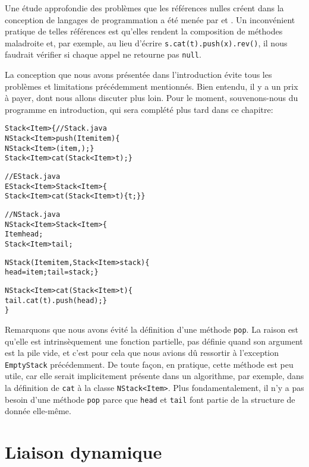 Une étude approfondie des problèmes que les références nulles créent
dans la conception de langages de programmation a été menée par
\cite{ChalinJames_2007,Cobbe_2008} et \cite{Hoare_2009}. Un
inconvénient pratique de telles références est qu'elles rendent la
composition de méthodes maladroite et, par exemple, au lieu d'écrire
\texttt{s.cat(t).push(x).rev()}, il nous faudrait vérifier si chaque
appel ne retourne pas \texttt{null}.

La conception que nous avons présentée dans l'introduction évite tous
les problèmes et limitations précédemment mentionnés. Bien entendu, il
y a un prix à payer, dont nous allons discuter plus loin. Pour le
moment, souvenons-nous du programme \Java en introduction, qui sera
complété plus tard dans ce chapitre:
\begin{alltt}
\public \abstractX \class Stack<Item> \{\hfill// Stack.java
  \public \final NStack<Item> push(\final Item item) \{
    \return \new NStack<Item>(item,\this); \}
  \public \abstractX Stack<Item> cat(\final Stack<Item> t); \}

// EStack.java
\public \final \class EStack<Item> \extends Stack<Item> \{
  \public Stack<Item> cat(\final Stack<Item> t) \{ \return t; \}\}

// NStack.java
\public \final \class NStack<Item> \extends Stack<Item> \{
  \private \final Item head;
  \private \final Stack<Item> tail;

  \public NStack(\final Item item, \final Stack<Item> stack) \{
    head = item; tail = stack; \}

  \public NStack<Item> cat(\final Stack<Item> t) \{
    \return tail.cat(t).push(head); \}
\}
\end{alltt}
Remarquons que nous avons évité la définition d'une méthode
\texttt{pop}. La raison est qu'elle est intrinsèquement une fonction
partielle, pas définie quand son argument est la pile vide, et c'est
pour cela que nous avions dû ressortir à l'exception
\texttt{EmptyStack} précédemment. De toute façon, en pratique, cette
méthode est peu utile, car elle serait implicitement présente dans un
algorithme, par exemple, dans la définition de \texttt{cat} à la
classe \texttt{NStack<Item>}. Plus fondamentalement, il n'y a pas
besoin d'une méthode \texttt{pop} parce que \texttt{head} et
\texttt{tail} font partie de la structure de donnée elle-même.

\section{Liaison dynamique}
\label{sec:single_dispatch}

